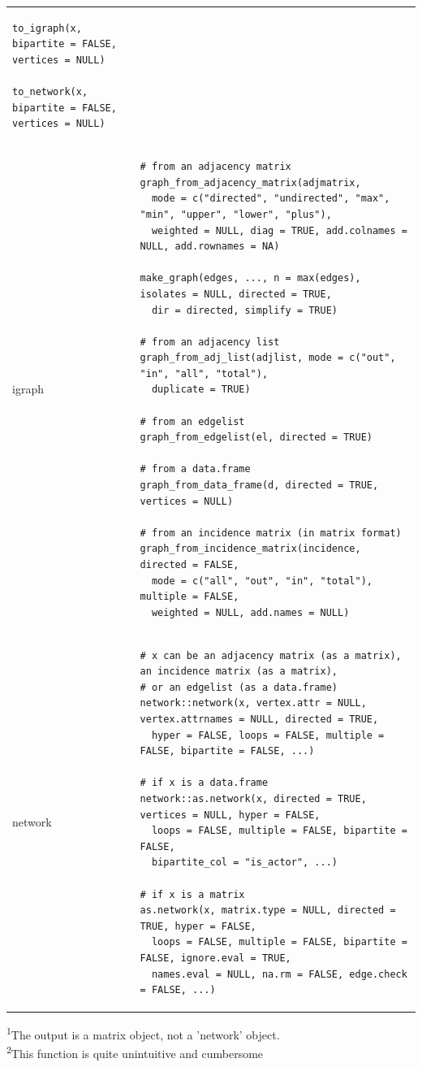 \documentclass[
]{article}
\begin{document}
\begin{longtable}{ll}
\begin{verbatim}
to_igraph(x, bipartite = FALSE, vertices = NULL)

to_network(x, bipartite = FALSE, vertices = NULL)
\end{verbatim} \\ 
igraph & \begin{verbatim}
# from an adjacency matrix
graph_from_adjacency_matrix(adjmatrix, 
  mode = c("directed", "undirected", "max", "min", "upper", "lower", "plus"),
  weighted = NULL, diag = TRUE, add.colnames = NULL, add.rownames = NA)

make_graph(edges, ..., n = max(edges), isolates = NULL, directed = TRUE, 
  dir = directed, simplify = TRUE)

# from an adjacency list
graph_from_adj_list(adjlist, mode = c("out", "in", "all", "total"), 
  duplicate = TRUE)

# from an edgelist
graph_from_edgelist(el, directed = TRUE)

# from a data.frame
graph_from_data_frame(d, directed = TRUE, vertices = NULL)

# from an incidence matrix (in matrix format)
graph_from_incidence_matrix(incidence, directed = FALSE, 
  mode = c("all", "out", "in", "total"), multiple = FALSE,
  weighted = NULL, add.names = NULL)
\end{verbatim} \\ 
network & \begin{verbatim}
# x can be an adjacency matrix (as a matrix), an incidence matrix (as a matrix), 
# or an edgelist (as a data.frame)
network::network(x, vertex.attr = NULL, vertex.attrnames = NULL, directed = TRUE,
  hyper = FALSE, loops = FALSE, multiple = FALSE, bipartite = FALSE, ...)

# if x is a data.frame
network::as.network(x, directed = TRUE, vertices = NULL, hyper = FALSE, 
  loops = FALSE, multiple = FALSE, bipartite = FALSE, 
  bipartite_col = "is_actor", ...)

# if x is a matrix
as.network(x, matrix.type = NULL, directed = TRUE, hyper = FALSE, 
  loops = FALSE, multiple = FALSE, bipartite = FALSE, ignore.eval = TRUE,
  names.eval = NULL, na.rm = FALSE, edge.check = FALSE, ...)
\end{verbatim} \\ 
\bottomrule
\end{longtable}
\begin{minipage}{\linewidth}
\textsuperscript{1}The output is a matrix object, not a 'network' object.\\
\textsuperscript{2}This function is quite unintuitive and cumbersome\\
\end{minipage}
\end{document}
